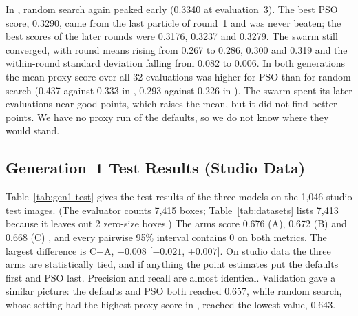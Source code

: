 In \gentwo, random search again peaked early (0.3340 at evaluation~3). The best PSO score, 0.3290, came from the last particle of round~1 and was never beaten; the best scores of the later rounds were 0.3176, 0.3237 and 0.3279. The swarm still converged, with round means rising from 0.267 to 0.286, 0.300 and 0.319 and the within-round standard deviation falling from 0.082 to 0.006. In both generations the mean proxy score over all 32 evaluations was higher for PSO than for random search (0.437 against 0.333 in \genone, 0.293 against 0.226 in \gentwo). The swarm spent its later evaluations near good points, which raises the mean, but it did not find better points. We have no \gentwo proxy run of the defaults, so we do not know where they would stand.

\subsection{Generation~1 Test Results (Studio Data)}
\label{subsec:res-gen1}

Table~\ref{tab:gen1-test} gives the test results of the three \genone models on the 1,046 studio test images. (The evaluator counts 7,415 boxes; Table~\ref{tab:datasets} lists 7,413 because it leaves out 2 zero-size boxes.) The arms score 0.676 (A), 0.672 (B) and 0.668 (C) \mapfifty, and every pairwise 95\% interval contains 0 on both metrics. The largest difference is C$-$A, $-0.008$ [$-0.021$, $+0.007$]. On studio data the three arms are statistically tied, and if anything the point estimates put the defaults first and PSO last. Precision and recall are almost identical. Validation gave a similar picture: the defaults and PSO both reached 0.657, while random search, whose setting had the highest proxy score in \genone, reached the lowest value, 0.643.

